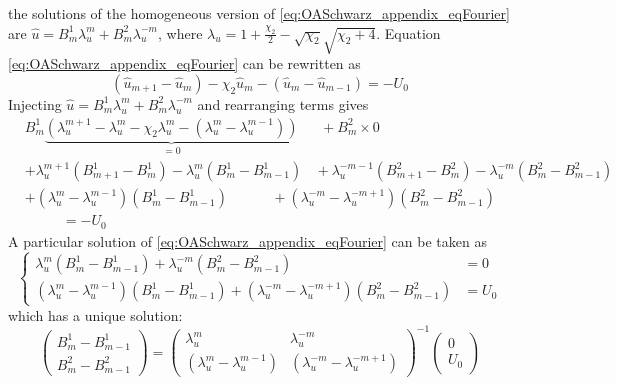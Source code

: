 \begin{itemize}
	the solutions of the homogeneous version of
	\eqref{eq:OASchwarz_appendix_eqFourier} are
		$\widehat{u} = B^1_m \lambda_u^m +
			B^2_m \lambda_u^{-m}$, where
	$\lambda_u=1+\frac{\chi_2}{2} -\sqrt{\chi_2}\sqrt{\chi_2+4}$.
	Equation \eqref{eq:OASchwarz_appendix_eqFourier}
	can be rewritten as
	\begin{equation}
		(\widehat{u}_{m+1} - \widehat{u}_{m})
		-\chi_2 \widehat{u}_{m}
		- (\widehat{u}_{m} - \widehat{u}_{m-1})
		= -U_0
	\end{equation}
	Injecting $\widehat{u} = B^1_m \lambda_u^m +
	B^2_m \lambda_u^{-m}$ and rearranging terms gives
\begin{equation}
	\begin{aligned}
	&B^1_m \underbrace{\left(
		\lambda_u^{m+1} - \lambda_u^m - \chi_2 \lambda_u^m
		- (\lambda_u^{m} - \lambda_u^{m-1})
		\right)}_{=0} ~~~~~~~+ B^2_m \times 0 \\
	&+ \lambda_u^{m+1} (B_{m+1}^1 - B_m^1)
		- \lambda_u^{m} (B_{m}^1 - B_{m-1}^1)
		~~~~+ \lambda_u^{-m-1} (B_{m+1}^2 - B_m^2)
		- \lambda_u^{-m} (B_{m}^2 - B_{m-1}^2)
		\\
	&+ (\lambda_u^m - \lambda_u^{m-1})(B_{m}^1 - B_{m-1}^1)
		~~~~~~~~~~~~~~+ (\lambda_u^{-m} - \lambda_u^{-m+1})
				(B_{m}^2 - B_{m-1}^2)\\
		&~~~~~~~~~~~~= -U_0
	\end{aligned}
\end{equation}
A particular solution of \eqref{eq:OASchwarz_appendix_eqFourier}
can be taken as
\begin{equation}
\begin{cases}
	\lambda_u^m(B_m^1 - B_{m-1}^1)
	+ \lambda_u^{-m}(B_m^2 - B_{m-1}^2)&= 0 \\
	(\lambda_u^m - \lambda_u^{m-1})(B_m^1 - B_{m-1}^1)
	+ (\lambda_u^{-m} - \lambda_u^{-m+1})(B_m^2 - B_{m-1}^2)
	&= {U_0}
\end{cases}
\end{equation}
which has a unique solution:
\begin{equation}
	\begin{pmatrix}
B_m^1 - B_{m-1}^1\\
B_m^2 - B_{m-1}^2
	\end{pmatrix}
	=
	\begin{pmatrix}
		\lambda_u^m & \lambda_u^{-m} \\
		(\lambda_u^m - \lambda_u^{m-1})  & 
		(\lambda_u^{-m} - \lambda_u^{-m+1})
	\end{pmatrix}^{-1}
	\begin{pmatrix}
		0 \\ U_0

\end{pmatrix}
\end{equation}
\end{itemize}
